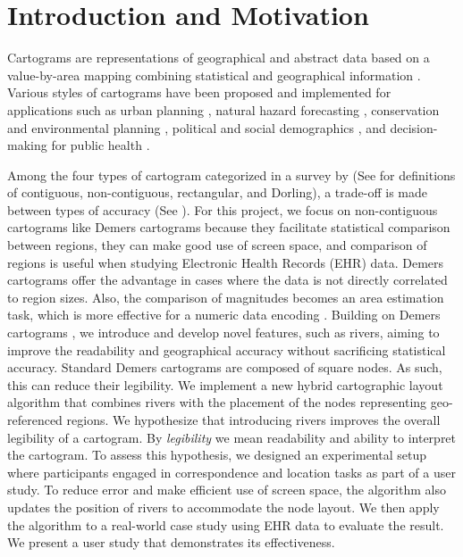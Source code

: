 \section{Introduction and Motivation}

Cartograms are representations of geographical and abstract data based on a value-by-area mapping combining statistical and geographical information \cite{dent2009Cartography,inoue2011New}. 
Various styles of cartograms have been proposed and implemented for applications such as urban planning \cite{harris2018Mapping, arranz-lopez2021Enduser}, natural hazard forecasting \cite{pappenberger2019Cartograms, park2020Flood}, conservation and environmental planning \cite{galluzzi2018Mapping, rocchini2019Cartogramming}, political and social demographics \cite{breitzman2018Using, alieva2021How}, and decision-making for public health \cite{gao2020Visualising, sack2021Visualizing}.

Among the four types of cartogram categorized in a survey by  (See  for definitions of contiguous, non-contiguous, rectangular, and Dorling), a trade-off is made between types of accuracy (See ).
For this project, we focus on non-contiguous cartograms like Demers cartograms because they facilitate statistical comparison between regions, they can make good use of screen space, and comparison of regions is useful when studying Electronic Health Records (EHR) data.
Demers cartograms offer the advantage in cases where the data is not directly correlated to region sizes. Also, the comparison of magnitudes becomes an area estimation task, which is more effective for a numeric data encoding \cite{munzner2014Visualization}.
Building on Demers cartograms \cite{ian2002Cartogram}, we introduce and develop novel features, such as rivers, aiming to improve the readability and geographical accuracy without sacrificing statistical accuracy.
Standard Demers cartograms are composed of square nodes. As such, this can reduce their legibility.
We implement a new hybrid cartographic layout algorithm that combines rivers with the placement of the nodes representing geo-referenced regions. 
We hypothesize that introducing rivers improves the overall legibility of a cartogram. 
By \textit{legibility} we mean readability and ability to interpret the cartogram.  
To assess this hypothesis, we designed an experimental setup where participants engaged in correspondence and location tasks as part of a user study.
To reduce error and make efficient use of screen space, the algorithm also updates the position of rivers to accommodate the node layout.
We then apply the algorithm to a real-world case study using EHR data to evaluate the result.
We present a user study that demonstrates its effectiveness.

